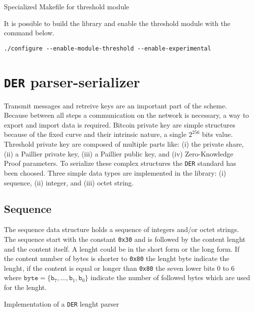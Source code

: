 \begin{listing}
	\caption{Specialized Makefile for threshold module}
	\label{lst:specializedMakefile}
\end{listing}

It is possible to build the library and enable the threshold module with the
command below.

\begin{verbatim}
./configure --enable-module-threshold --enable-experimental
\end{verbatim}


\section{\texttt{DER} parser-serializer}

Transmit messages and retreive keys are an important part of the scheme. Because
between all steps a communication on the network is necessary, a way to export and
import data is required. Bitcoin private key are simple structures because of the
fixed curve and their intrinsic nature, a single $2^{256}$ bits value. Threshold
private key are composed of multiple parts like: (i) the private share, (ii) a
Paillier private key, (iii) a Paillier public key, and (iv) Zero-Knowledge Proof
parameters. To serialize these complex structures the \texttt{DER} standard has been choosed.
Three simple data types are implemented in the library: (i) sequence, (ii) integer,
and (iii) octet string.

\subsection{Sequence}

The sequence data structure holds a sequence of integers and/or octet strings. The
sequence start with the constant \texttt{0x30} and is followed by the content lenght
and the content itself.
A lenght could be in the short form or the long form. If the content number of bytes
is shorter to \texttt{0x80} the lenght byte indicate the lenght, if the content
is equal or longer than \texttt{0x80} the seven lower bits 0 to 6 where
$\texttt{byte} = \{ \texttt{b}_7, \dots, \texttt{b}_1, \texttt{b}_0\}$
indicate the number of followed bytes which are used for the lenght.

\begin{listing}
	\caption{Implementation of a \texttt{DER} lenght parser}
	\label{lst:implDERLenghtParser}
\end{listing}

